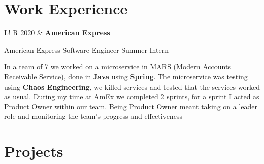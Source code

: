\documentclass[10pt, a4paper]{article}
\newcommand\vsep{\color{lightgray} \vrule width 0.5pt}
\newcommand\sect[1]{\section*{\hspace{.05cm} \Large\sc #1}}
\begin{document}
        \sect{Work Experience}
            \begin{tabular}{L!{\vsep}R}
                2020 & \textbf{American Express} \smallskip

                    American Express Software Engineer Summer Intern 
                    \smallskip

                    In a team of 7 we worked on a microservice in MARS (Modern Accounts Receivable Service), done in \textbf{Java} using \textbf{Spring}. The microservice was testing using \textbf{Chaos Engineering}, we killed services and tested that the services worked as usual. During my time at AmEx we completed 2 sprints, for a sprint I acted as Product Owner within our team. Being Product Owner meant taking on a leader role and monitoring the team's progress and effectiveness 
                    \smallskip
                    \\
            \end{tabular}
        \sect{Projects}
\end{document}
